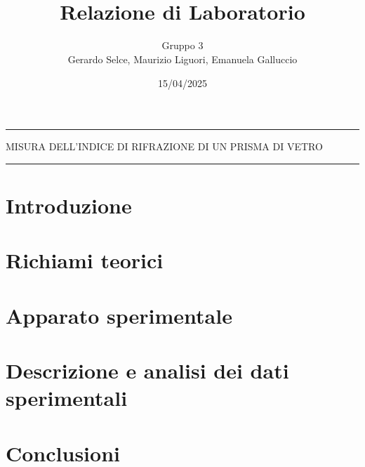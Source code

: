 \documentclass[11pt]{article}
\begin{document}
	\setlength{\parindent}{0pt}
	\title{\vspace{-4em}{\large Laboratorio di Meccanica e Termodinamica} \\
		Relazione di Laboratorio}
	\author{Gruppo 3 \\
		Gerardo Selce, Maurizio Liguori, Emanuela Galluccio}
	\date{15/04/2025}
	\maketitle
	
	\vspace{-2em}\par\noindent\rule{\textwidth}{0.4pt}
	\begin{center}
		{\Large\sc MISURA DELL'INDICE DI RIFRAZIONE DI UN PRISMA DI VETRO}
	\end{center}
	\par\noindent\rule{\textwidth}{0.4pt}
	
	
	\section{Introduzione}
	
	
	\section{Richiami teorici}
	
	
	\section{Apparato sperimentale}
	
	
	\section{Descrizione e analisi dei dati sperimentali}
	
	
	\section{Conclusioni}
	
	
\end{document}
